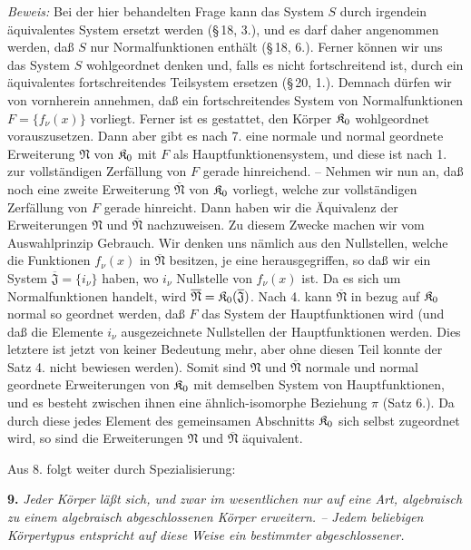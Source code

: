 \emph{Beweis:} Bei der hier behandelten Frage kann das System $S$ durch irgendein äquivalentes System ersetzt werden (\S\,18, 3.), und es darf daher angenommen werden, daß $S$ nur Normalfunktionen enthält (\S\,18, 6.). Ferner können wir uns das System $S$ wohlgeordnet denken und, falls es nicht fortschreitend ist, durch ein äquivalentes fortschreitendes Teilsystem ersetzen (\S\,20, 1.). Demnach dürfen wir von vornherein annehmen, daß ein fortschreitendes System von Normalfunktionen $F=\{f_\nu(x)\}$ vorliegt. Ferner ist es gestattet, den Körper $\mathfrak K_0$ wohlgeordnet vorauszusetzen. Dann aber gibt es nach 7. eine normale und normal geordnete Erweiterung $\mathfrak N$ von $\mathfrak K_0$ mit $F$ als Hauptfunktionensystem, und diese ist nach 1. zur vollständigen Zerfällung von $F$ gerade hinreichend. -- Nehmen wir nun an, daß noch eine zweite Erweiterung $\overline{\mathfrak N}$ von $\mathfrak K_0$ vorliegt, welche zur vollständigen Zerfällung von $F$ gerade hinreicht. Dann haben wir die Äquivalenz der Erweiterungen $\mathfrak N$ und $\overline{\mathfrak N}$ nachzuweisen. Zu diesem Zwecke machen wir vom Auswahlprinzip Gebrauch. Wir denken uns nämlich aus den Nullstellen, welche die Funktionen $f_\nu(x)$ in $\overline{\mathfrak N}$ besitzen, je eine herausgegriffen, so daß wir ein System $\overline{\mathfrak J}=\{i_\nu\}$ haben, wo $i_\nu$ Nullstelle von $f_\nu(x)$ ist. Da es sich um Normalfunktionen handelt, wird $\overline{\mathfrak N}=\mathfrak K_0(\overline{\mathfrak J})$. Nach 4. kann $\overline{\mathfrak N}$ in bezug auf $\mathfrak K_0$ normal so geordnet werden, daß $F$ das System der Hauptfunktionen wird (und daß die Elemente $i_\nu$ ausgezeichnete Nullstellen der Hauptfunktionen werden. Dies letztere ist jetzt von keiner Bedeutung mehr, aber ohne diesen Teil konnte der Satz 4. nicht bewiesen werden). Somit sind $\mathfrak N$ und $\overline{\mathfrak N}$ normale und normal geordnete Erweiterungen von $\mathfrak K_0$ mit demselben System von Hauptfunktionen, und es besteht zwischen ihnen eine ähnlich-isomorphe Beziehung $\pi$ (Satz 6.). Da durch diese jedes Element des gemeinsamen Abschnitts $\mathfrak K_0$ sich selbst zugeordnet wird, so sind die Erweiterungen $\mathfrak N$ und $\overline{\mathfrak N}$ äquivalent.

Aus 8. folgt weiter durch Spezialisierung:

\textbf{9.} \emph{Jeder Körper läßt sich, und zwar im wesentlichen nur auf eine Art, algebraisch zu einem algebraisch abgeschlossenen Körper erweitern. -- Jedem beliebigen Körpertypus entspricht auf diese Weise ein bestimmter abgeschlossener.}

